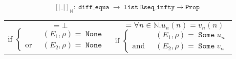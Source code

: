 \documentclass{article}
\newcommand{\Prop}{\texttt{Prop}}
\newcommand{\N}{\mathbb{N}}
\DeclareMathOperator{\None}{\mathtt{None}}
\DeclareMathOperator{\Some}{\mathtt{Some}}
\DeclareMathOperator{\alist}{\mathtt{list}}
\DeclareMathOperator{\de}{\mathtt{diff\_equa}}
\DeclareMathOperator{\Interp}{\mathtt{interp}}
\DeclareMathOperator{\Sem}{\left[\left| E_1 :=: E_2 \right|\right]}
\DeclareMathOperator{\SemN}{\Sem_{\N} \rho}
\DeclareMathOperator{\IN}{\Interp_{\N}}
\begin{document}
$$\left[\left| \_ \right|\right]_{\N} : \de \rightarrow \alist{}
\mathtt{Rseq\_infty} \rightarrow \Prop$$
\begin{tabular}{l|l}
\begin{minipage}{0.42\textwidth}
$$\SemN{} = \bot$$
$$\text{if } \left\lbrace
\begin{array}{ll}
& \IN(E_1, \rho) = \None\\
\text{or} & \IN(E_2, \rho) = \None
\end{array}\right.$$
\end{minipage}

& \begin{minipage}{0.58\textwidth}
$$\SemN{} = \forall n \in \N. u_n(n) = v_n(n)$$
$$\text{if } \left\lbrace
\begin{array}{ll}
& \IN(E_1, \rho) = \Some u_n\\
\text{and} & \IN(E_2, \rho) = \Some v_n
\end{array}\right.$$
\end{minipage}

\end{tabular}
\end{document}
